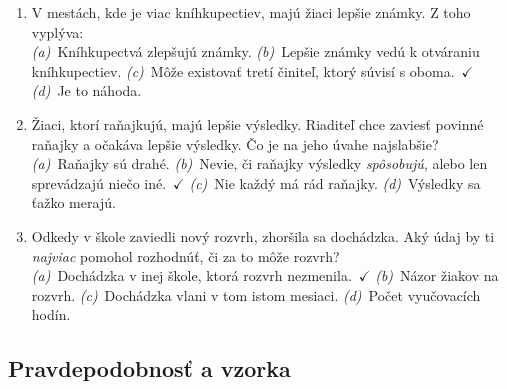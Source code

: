 \begin{enumerate}[nosep, label=K\arabic*., start=4]
    \item V mestách, kde je viac kníhkupectiev, majú žiaci lepšie známky. Z toho vyplýva:\\
    \textit{(a)}~Kníhkupectvá zlepšujú známky. \quad \textit{(b)}~Lepšie známky vedú k otváraniu kníhkupectiev. \quad \textit{(c)}~Môže existovať tretí činiteľ, ktorý súvisí s oboma.~$\checkmark$ \quad \textit{(d)}~Je to náhoda.

    \item Žiaci, ktorí raňajkujú, majú lepšie výsledky. Riaditeľ chce zaviesť povinné raňajky a očakáva lepšie výsledky. Čo je na jeho úvahe najslabšie?\\
    \textit{(a)}~Raňajky sú drahé. \quad \textit{(b)}~Nevie, či raňajky výsledky \emph{spôsobujú}, alebo len sprevádzajú niečo iné.~$\checkmark$ \quad \textit{(c)}~Nie každý má rád raňajky. \quad \textit{(d)}~Výsledky sa ťažko merajú.

    \item Odkedy v škole zaviedli nový rozvrh, zhoršila sa dochádzka. Aký údaj by ti \emph{najviac} pomohol rozhodnúť, či za to môže rozvrh?\\
    \textit{(a)}~Dochádzka v inej škole, ktorá rozvrh nezmenila.~$\checkmark$ \quad \textit{(b)}~Názor žiakov na rozvrh. \quad \textit{(c)}~Dochádzka vlani v tom istom mesiaci. \quad \textit{(d)}~Počet vyučovacích hodín.
\end{enumerate}

\subsection*{Pravdepodobnosť a vzorka}

